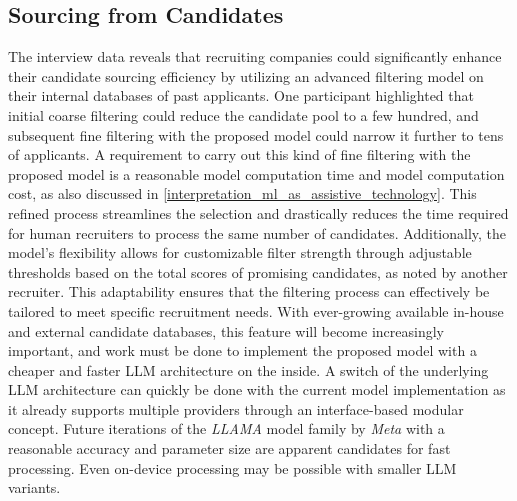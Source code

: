 \documentclass[draft,final]{thesisclass} %
\begin{document}
\subsection{Sourcing from Candidates}
The interview data reveals that recruiting companies could significantly enhance their candidate sourcing efficiency by utilizing an advanced filtering model on their internal databases of past applicants. One participant highlighted that initial coarse filtering could reduce the candidate pool to a few hundred, and subsequent fine filtering with the proposed model could narrow it further to tens of applicants. A requirement to carry out this kind of fine filtering with the proposed model is a reasonable model computation time and model computation cost, as also discussed in \ref{interpretation_ml_as_assistive_technology}. This refined process streamlines the selection and drastically reduces the time required for human recruiters to process the same number of candidates. Additionally, the model's flexibility allows for customizable filter strength through adjustable thresholds based on the total scores of promising candidates, as noted by another recruiter. This adaptability ensures that the filtering process can effectively be tailored to meet specific recruitment needs. With ever-growing available in-house and external candidate databases, this feature will become increasingly important, and work must be done to implement the proposed model with a cheaper and faster \gls{LLM} architecture on the inside. A switch of the underlying \gls{LLM} architecture can quickly be done with the current model implementation as it already supports multiple providers through an interface-based modular concept. Future iterations of the \textit{LLAMA} model family by \textit{Meta} with a reasonable accuracy and parameter size are apparent candidates for fast processing. Even on-device processing may be possible with smaller \gls{LLM} variants.
\end{document}
